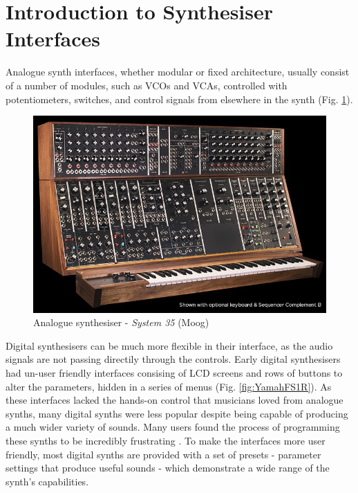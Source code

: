 \documentclass[11pt, oneside]{report}   	%
\begin{document}
\section{Introduction to Synthesiser Interfaces}
Analogue synth interfaces, whether modular or fixed architecture, usually consist of a number of modules, such as VCOs and VCAs, controlled with potentiometers, switches, and control signals from elsewhere in the synth (Fig. \ref{fig:MoogSystem35}). \\
%
\begin{figure}[h]
	\centering
	\includegraphics[width = 5in]{MoogSystem35.jpg}
	\caption{Analogue synthesiser - \emph{System 35} (Moog)}
	\label{fig:MoogSystem35}
\end{figure}
%
Digital synthesisers can be much more flexible in their interface, as the audio signals are not passing directily through the controls. Early digital synthesisers had un-user friendly interfaces consising of LCD screens and rows of buttons to alter the parameters, hidden in a series of menus (Fig. \ref{fig:YamahFS1R}). As these interfaces lacked the hands-on control that musicians loved from analogue synths, many digital synths were less popular despite being capable of producing a much wider variety of sounds. Many users found the process of programming these synths to be incredibly frustrating \cite{Synth}. To make the interfaces more user friendly, most digital synths are provided with a set of presets - parameter settings that produce useful sounds - which demonstrate a wide range of the synth's capabilities. %
\end{document}
